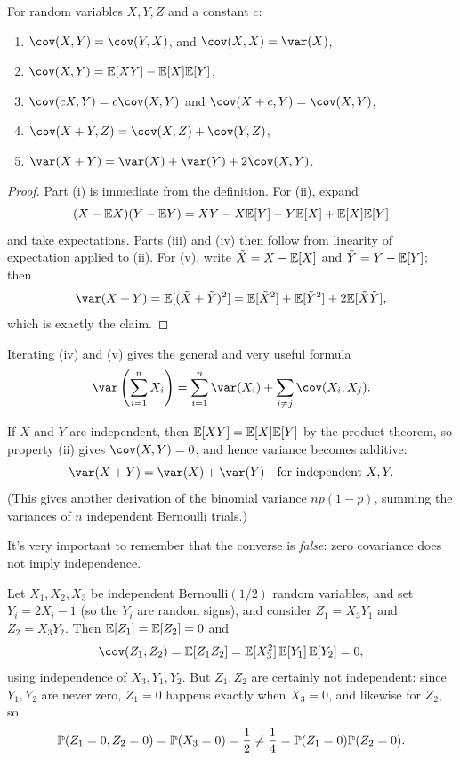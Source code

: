 \documentclass[a4paper]{scrartcl}
\begin{document}
\begin{proposition}
	For random variables $X, Y, Z$ and a constant $c$:
	\begin{enumerate}[label=(\roman*)]
		\item $\cov(X, Y) = \cov(Y, X)$, and $\cov(X, X) = \var(X)$,
		\item $\cov(X, Y) = \EE[XY] - \EE[X]\EE[Y]$,
		\item $\cov(cX, Y) = c\cov(X, Y)$ and $\cov(X + c, Y) = \cov(X, Y)$,
		\item $\cov(X + Y, Z) = \cov(X, Z) + \cov(Y, Z)$,
		\item $\var(X + Y) = \var(X) + \var(Y) + 2\cov(X, Y)$.
	\end{enumerate}
\end{proposition}
\begin{proof}
	Part (i) is immediate from the definition. For (ii), expand
	$$
	(X - \mathbb{E} X)(Y - \mathbb{E} Y) = XY - X \mathbb{E}[Y] - Y \mathbb{E}[X] + \mathbb{E}[X]\mathbb{E}[Y]
	$$
	and take expectations. Parts (iii) and (iv) then follow from linearity of expectation applied to (ii). For (v), write $\tilde{X} = X - \mathbb{E}[X]$ and $\tilde{Y} = Y - \mathbb{E}[Y]$; then
	$$
	\var(X + Y) = \EE[(\tilde X + \tilde Y)^2] = \EE[\tilde X^2] + \EE[\tilde Y^2] + 2\EE[\tilde X \tilde Y],
	$$
	which is exactly the claim.
\end{proof}

Iterating (iv) and (v) gives the general and very useful formula
$$
\var\left(\sum_{i = 1}^{n} X_i\right) = \sum_{i = 1}^{n} \var(X_i) + \sum_{i \neq j} \cov(X_i, X_j).
$$

If $X$ and $Y$ are independent, then $\mathbb{E}[XY] = \mathbb{E}[X]\mathbb{E}[Y]$ by the product theorem, so property (ii) gives $\cov(X, Y) = 0$, and hence variance becomes additive:
$$
\var(X + Y) = \var(X) + \var(Y) \quad \text{for independent } X, Y.
$$
(This gives another derivation of the binomial variance $np(1-p)$, summing the variances of $n$ independent Bernoulli trials.)

It's very important to remember that the converse is \emph{false}: zero covariance does not imply independence.

\begin{example}
	Let $X_1, X_2, X_3$ be independent $\mathrm{Bernoulli}(1/2)$ random variables, and set $Y_i = 2X_i - 1$ (so the $Y_i$ are random signs), and consider $Z_1 = X_3 Y_1$ and $Z_2 = X_3 Y_2$. Then $\mathbb{E}[Z_1] = \mathbb{E}[Z_2] = 0$ and
	$$
	\cov(Z_1, Z_2) = \EE[Z_1 Z_2] = \EE[X_3^2]\,\EE[Y_1]\,\EE[Y_2] = 0,
	$$
	using independence of $X_3, Y_1, Y_2$. But $Z_1, Z_2$ are certainly not independent: since $Y_1, Y_2$ are never zero, $Z_1 = 0$ happens exactly when $X_3 = 0$, and likewise for $Z_2$, so
	$$
	\mathbb{P}(Z_1 = 0, Z_2 = 0) = \mathbb{P}(X_3 = 0) = \frac{1}{2} \neq \frac{1}{4} = \mathbb{P}(Z_1 = 0)\mathbb{P}(Z_2 = 0).
	$$
\end{example}
\end{document}
